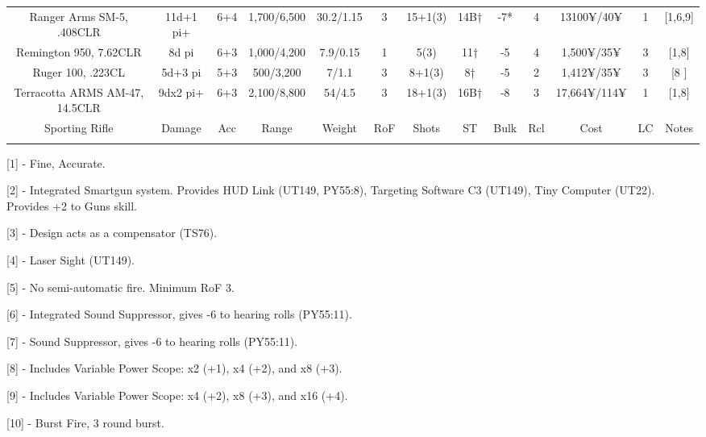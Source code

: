 \begin{center}
\begin{adjustwidth}{-8mm}{}
{\begin{tabular}{|c|c|c|c|c|c|c|c|c|c|c|c|c|}
				Ranger Arms SM-5, .408CLR & 11d+1 pi+ & 6+4 & 1,700/6,500 & 30.2/1.15 & 3 & 15+1(3) & 14B† & -7* & 4 & 13100¥/40¥  & 1 & [1,6,9] \\ 
				Remington 950, 7.62CLR &  8d pi & 6+3 & 1,000/4,200 & 7.9/0.15 & 1 & 5(3) & 11† & -5 & 4 & 1,500¥/35¥ & 3 & [1,8] \\
				Ruger 100, .223CL & 5d+3 pi & 5+3 & 500/3,200 & 7/1.1 & 3 & 8+1(3) & 8† & -5 & 2 & 1,412¥/35¥ & 3 & [8 ]\\
				Terracotta ARMS AM-47, 14.5CLR & 9dx2 pi+ & 6+3 & 2,100/8,800 &  54/4.5 & 3 & 18+1(3) & 16B† & -8 & 3 &  17,664¥/114¥ & 1 & [1,8] \\
				\hline
				Sporting Rifle & Damage & Acc & Range & Weight & RoF & Shots & ST & Bulk & Rcl & Cost & LC & Notes\\
				\hline
				\\
				\hline
			\end{tabular}
		}
	\end{adjustwidth}
\end{center}

[1] - Fine, Accurate.

[2] - Integrated Smartgun system. Provides HUD Link (UT149, PY55:8), Targeting Software C3 (UT149), Tiny Computer (UT22). Provides +2 to Guns skill.

[3] - Design acts as a compensator (TS76).

[4] - Laser Sight (UT149).

[5] - No semi-automatic fire. Minimum RoF 3.

[6] - Integrated Sound Suppressor, gives -6 to hearing rolls (PY55:11).

[7] - Sound Suppressor, gives -6 to hearing rolls (PY55:11).

[8] - Includes Variable Power Scope: x2 (+1), x4 (+2), and x8 (+3).

[9] - Includes Variable Power Scope: x4 (+2), x8 (+3), and x16 (+4).

[10] - Burst Fire, 3 round burst.

